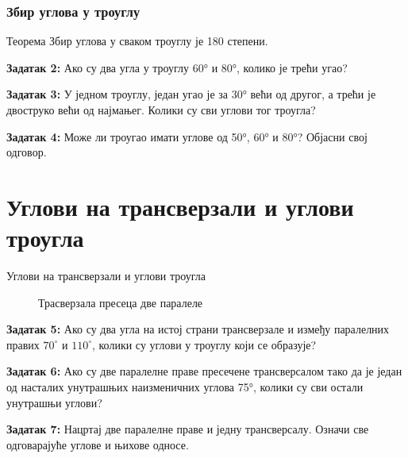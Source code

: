 \documentclass[12pt]{beamer}
\begin{document}
\begin{frame}\frametitle{Збир углова у троуглу}

\begin{block}{Теорема}
Збир углова у сваком троуглу је 180 степени.
\end{block}

\textbf{Задатак 2:}
Ако су два угла у троуглу 60° и 80°, колико је трећи угао?


\textbf{Задатак 3:}
У једном троуглу, један угао је за 30° већи од другог, а трећи је двоструко већи од најмањег. Колики су сви углови тог троугла?

\textbf{Задатак 4:}
Може ли троугао имати углове од 50°, 60° и 80°? Објасни свој одговор.

\end{frame}


\section{Углови на трансверзали и углови троугла}
\begin{frame}{Углови на трансверзали и углови троугла}

\begin{figure}[!ht]
\centering
{}%
\caption{Трасверзала пресеца две паралеле}
\label{transverzala}
\end{figure}

\textbf{Задатак 5:}
Ако су два угла на истој страни трансверзале и између паралелних правих $70^\circ$ и $110^\circ$, колики су углови у троуглу који се образује?

\textbf{Задатак 6:}
Ако су две паралелне праве пресечене трансверсалом тако да је један од насталих унутрашњих наизменичних углова 75°, колики су сви остали унутрашњи углови?

\textbf{Задатак 7:}
Нацртај две паралелне праве и једну трансверсалу. Означи све одговарајуће углове и њихове односе.

\end{frame}
\end{document}
